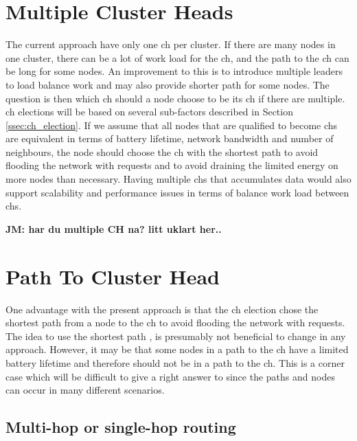 \documentclass[USenglish]{uit-thesis}
\begin{document}
\section{Multiple Cluster Heads} \label{disc:multi_ch}
The current approach have only one \gls{ch} per cluster. If there are many nodes in one cluster, there can be a lot of work load for the \gls{ch}, and the path to the \gls{ch} can be long for some nodes.
An improvement to this is to introduce multiple leaders to load balance work and may also provide shorter path for some nodes. The question is then which \gls{ch} should a node choose to be its \gls{ch} if there are multiple. \gls{ch} elections will be based on several sub-factors described in Section \ref{ssec:ch_election}. If we assume that all nodes that are qualified to become \gls{ch}s are equivalent in terms of battery lifetime, network bandwidth and number of neighbours, the node should choose the \gls{ch} with the shortest path to avoid flooding the network with requests and to avoid draining the limited energy on more nodes than necessary. Having multiple \glspl{ch} that accumulates data would also support scalability and performance issues in terms of balance work load between \glspl{ch}.

\textbf{JM: har du multiple CH na? litt uklart her..}

\section{Path To Cluster Head} \label{disc:ch_path}
One advantage with the present approach is that the \gls{ch} election chose the shortest path from a node to the \gls{ch} to avoid flooding the network with requests. The idea to use the shortest path \cite{dijkstra}, is presumably not beneficial to change in any approach. However, it may be that some nodes in a path to the \gls{ch} have a limited battery lifetime and therefore should not be in a path to the \gls{ch}. This is a corner case which will be difficult to give a right answer to since the paths and nodes can occur in many different scenarios.



\subsection{Multi-hop or single-hop routing} \label{disc:hopping}
\end{document}

